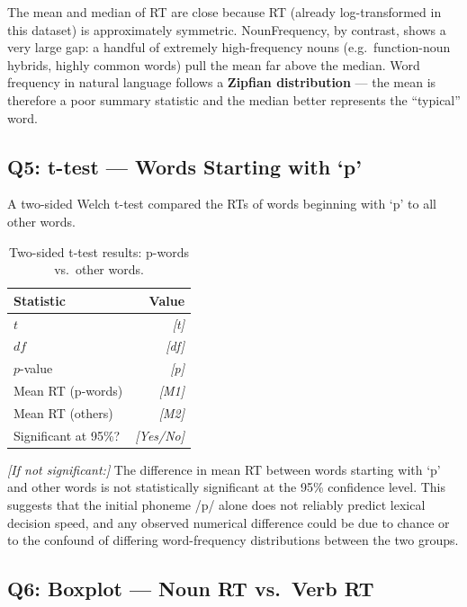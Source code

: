 \documentclass[12pt,a4paper]{article}
\newcommand{\placeholder}[1]{\textcolor{red!70!black}{\textit{[#1]}}}
\begin{document}
The mean and median of RT are close because RT (already log-transformed in this
dataset) is approximately symmetric.  NounFrequency, by contrast, shows a very
large gap: a handful of extremely high-frequency nouns (e.g.\ function-noun
hybrids, highly common words) pull the mean far above the median.  Word
frequency in natural language follows a \textbf{Zipfian distribution} — the
mean is therefore a poor summary statistic and the median better represents the
``typical'' word.

\subsection{Q5: t-test — Words Starting with `p'}

A two-sided Welch t-test compared the RTs of words beginning with `p' to all
other words.

\begin{table}[H]
\centering
\caption{Two-sided t-test results: p-words vs.\ other words.}
\begin{tabular}{lr}
\toprule
\textbf{Statistic} & \textbf{Value} \\
\midrule
$t$ & \placeholder{t} \\
$df$ & \placeholder{df} \\
$p$-value & \placeholder{p} \\
Mean RT (p-words) & \placeholder{M1} \\
Mean RT (others)  & \placeholder{M2} \\
Significant at 95\%? & \placeholder{Yes/No} \\
\bottomrule
\end{tabular}
\end{table}

\placeholder{If not significant:} The difference in mean RT between words
starting with `p' and other words is not statistically significant at the 95\%
confidence level.  This suggests that the initial phoneme /p/ alone does not
reliably predict lexical decision speed, and any observed numerical difference
could be due to chance or to the confound of differing word-frequency
distributions between the two groups.

\subsection{Q6: Boxplot — Noun RT vs.\ Verb RT}
\end{document}
